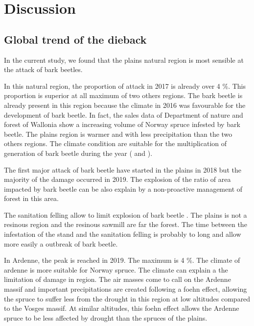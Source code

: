 \documentclass[3p,procedia]{elsarticle}
\begin{document}
\section{Discussion}

\subsection{Global trend of the dieback}

In the current study, we found that the plains natural region is most sensible at the attack of bark beetles.

In this natural region, the proportion of attack in 2017 is already over 4 \%. 
This proportion is superior at all maximum of two others regions. 
The bark beetle is already present in this region because the climate in 2016 was favourable for the development of bark beetle. 
In fact, the sales data of Department of nature and forest of Wallonia show a increasing volume of Norway spruce infested by bark beetle.
The plains region is warmer and with less precipitation than the two others regions.
The climate condition are suitable for the multiplication of generation of bark beetle during the year (\citep{baier_phenipscomprehensive_2007} and \citep{annila_influence_1969}).

The first major attack of bark beetle have started in the plains in 2018 but the majority of the damage occurred in 2019. 
The explosion of the ratio of area impacted by bark beetle can be also explain by a non-proactive management of forest in this area.

The sanitation felling allow to limit explosion of bark beetle \citep{stadelmann_effects_2013}.
The plains is not a resinous region and the resinous sawmill are far the forest. 
The time between the infestation of the stand and the sanitation felling is probably to long and allow more easily a outbreak of bark beetle.

In Ardenne, the peak is reached in 2019. The maximum is 4 \%. The climate of ardenne is more suitable for Norway spruce. 
The climate can explain a the limitation of damage in region. 
The air masses come to call on the Ardenne massif and important precipitations are created following a foehn effect, allowing the spruce to suffer less from the drought in this region at low altitudes compared to the Vosges massif. 
At similar altitudes, this foehn effect allows the Ardenne spruce to be less affected by drought than the spruces of the plains.
\end{document}
